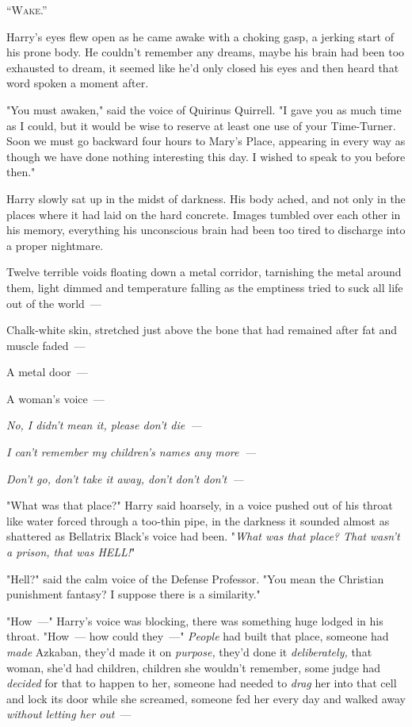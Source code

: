 
\lettrine{“W}{ake.''}

Harry's eyes flew open as he came awake with a choking gasp, a jerking start of
his prone body. He couldn't remember any dreams, maybe his brain had been too
exhausted to dream, it seemed like he'd only closed his eyes and then heard
that word spoken a moment after.

"You must awaken," said the voice of Quirinus Quirrell. "I gave you as much
time as I could, but it would be wise to reserve at least one use of your
Time-Turner. Soon we must go backward four hours to Mary's Place, appearing in
every way as though we have done nothing interesting this day. I wished to
speak to you before then."

Harry slowly sat up in the midst of darkness. His body ached, and not only in
the places where it had laid on the hard concrete. Images tumbled over each
other in his memory, everything his unconscious brain had been too tired to
discharge into a proper nightmare.

Twelve terrible voids floating down a metal corridor, tarnishing the metal
around them, light dimmed and temperature falling as the emptiness tried to
suck all life out of the world~---

Chalk-white skin, stretched just above the bone that had remained after fat and
muscle faded~---

A metal door~---

A woman's voice~---

\emph{No, I didn't mean it, please don't die~--- }

\emph{I can't remember my children's names any more~--- }

\emph{Don't go, don't take it away, don't don't don't~--- }

"What was that place?" Harry said hoarsely, in a voice pushed out of his throat
like water forced through a too-thin pipe, in the darkness it sounded almost as
shattered as Bellatrix Black's voice had been. "\emph{What was that place? That
wasn't a prison, that was HELL!}"

"Hell?" said the calm voice of the Defense Professor. "You mean the Christian
punishment fantasy? I suppose there is a similarity."

"How~---" Harry's voice was blocking, there was something huge lodged in his
throat. "How~--- how could they~---" \emph{People} had built that place, someone
had \emph{made} Azkaban, they'd made it on \emph{purpose,} they'd done it
\emph{deliberately,} that woman, she'd had children, children she wouldn't
remember, some judge had \emph{decided} for that to happen to her, someone had
needed to \emph{drag} her into that cell and lock its door while she screamed,
someone fed her every day and walked away \emph{without letting her out}~---


